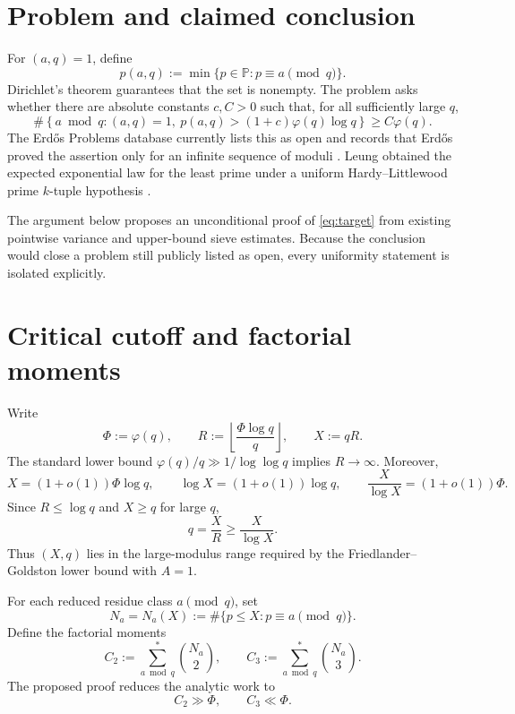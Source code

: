 \documentclass[11pt]{article}
\theoremstyle{definition}
\theoremstyle{remark}
\newcommand{\Pp}{\mathbb P}
\newcommand{\ph}{\varphi}
\begin{document}
\tableofcontents

\section{Problem and claimed conclusion}

For $(a,q)=1$, define
\[
  p(a,q):=\min\{p\in\Pp:p\equiv a\pmod q\}.
\]
Dirichlet's theorem guarantees that the set is nonempty.
The problem asks whether there are absolute constants $c,C>0$ such that, for all sufficiently large $q$,
\begin{equation}\label{eq:target}
  \#\left\{a\bmod q:(a,q)=1,\ p(a,q)>(1+c)\ph(q)\log q\right\}
  \ge C\ph(q).
\end{equation}
The Erd\H{o}s Problems database currently lists this as open and records that Erd\H{o}s proved the assertion only for an infinite sequence of moduli \cite{ErdosProblems971,Erdos1950}.
Leung obtained the expected exponential law for the least prime under a uniform Hardy--Littlewood prime $k$-tuple hypothesis \cite{Leung2024}.

The argument below proposes an unconditional proof of \eqref{eq:target} from existing pointwise variance and upper-bound sieve estimates.
Because the conclusion would close a problem still publicly listed as open, every uniformity statement is isolated explicitly.

\section{Critical cutoff and factorial moments}

Write
\[
  \Phi:=\ph(q),\qquad
  R:=\left\lfloor\frac{\Phi\log q}{q}\right\rfloor,
  \qquad X:=qR.
\]
The standard lower bound $\ph(q)/q\gg 1/\log\log q$ implies $R\to\infty$.
Moreover,
\begin{equation}\label{eq:cutoff-asymp}
  X=(1+o(1))\Phi\log q,
  \qquad \log X=(1+o(1))\log q,
  \qquad \frac{X}{\log X}=(1+o(1))\Phi.
\end{equation}
Since $R\le \log q$ and $X\ge q$ for large $q$,
\begin{equation}\label{eq:FG-range}
  q=\frac XR\ge \frac{X}{\log X}.
\end{equation}
Thus $(X,q)$ lies in the large-modulus range required by the Friedlander--Goldston lower bound with $A=1$.

For each reduced residue class $a\pmod q$, set
\[
  N_a=N_a(X):=\#\{p\le X:p\equiv a\pmod q\}.
\]
Define the factorial moments
\begin{equation}\label{eq:moments}
  C_2:=\sum_{a\bmod q}^{*}\binom{N_a}{2},
  \qquad
  C_3:=\sum_{a\bmod q}^{*}\binom{N_a}{3}.
\end{equation}
The proposed proof reduces the analytic work to
\begin{equation}\label{eq:key-moments}
  C_2\gg\Phi,
  \qquad
  C_3\ll\Phi.
\end{equation}
\end{document}
